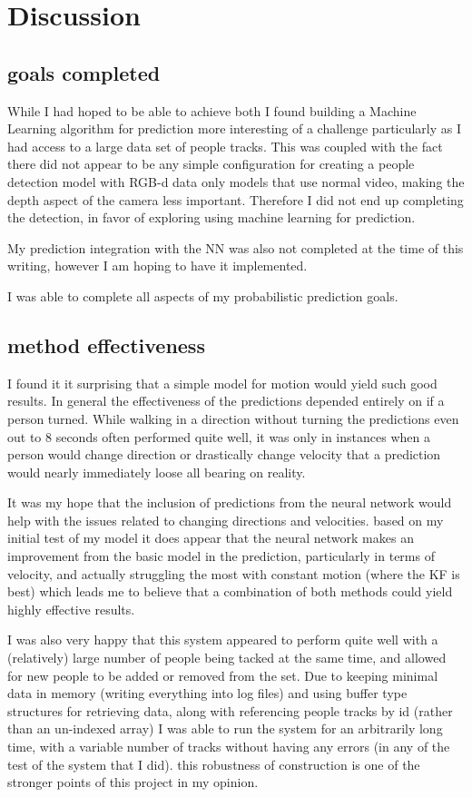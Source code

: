 \documentclass[10pt,a4paper]{article}
\begin{document}
\section{Discussion}

\subsection{goals completed}
While I had hoped to be able to achieve both I found building a Machine Learning algorithm for prediction more interesting of a challenge particularly as I had access to a large data set of people tracks. This was coupled with the fact there did not appear to be any simple configuration for creating a people detection model with RGB-d data only models that use normal video, making the depth aspect of the camera less important. Therefore I did not end up completing the detection, in favor of exploring using machine learning for prediction. 

My prediction integration with the NN was also not completed at the time of this writing, however I am hoping to have it implemented.

I was able to complete all aspects of my probabilistic prediction goals. 

\subsection{method effectiveness}
I found it it surprising that a simple model for motion would yield such good results. In general the effectiveness of the predictions depended entirely on if a person turned. While walking in a direction without turning the predictions even out to 8 seconds often performed quite well, it was only in instances when a person would change direction or drastically change velocity that a prediction would nearly immediately loose all bearing on reality.

It was my hope that the inclusion of predictions from the neural network would help with the issues related to changing directions and velocities. based on my initial test of my model it does appear that the neural network makes an improvement from the basic model in the prediction, particularly in terms of velocity, and actually struggling the most with constant motion (where the KF is best) which leads me to believe that a combination of both methods could yield highly effective results.

I was also very happy that this system appeared to perform quite well with a (relatively) large number of people being tacked at the same time, and allowed for new people to be added or removed from the set. Due to keeping minimal data in memory (writing everything into log files) and using buffer type structures for retrieving data, along with referencing people tracks by id (rather than an un-indexed array) I was able to run the system for an arbitrarily long time, with a variable number of tracks without having any errors (in any of the test of the system that I did). this robustness of construction is one of the stronger points of this project in my opinion. 
\end{document}
